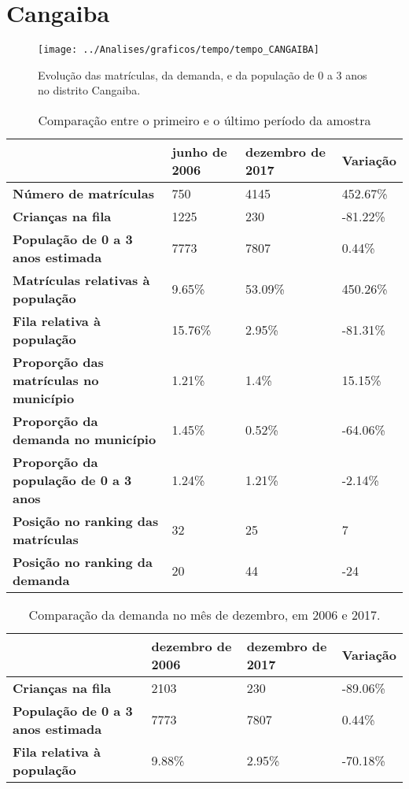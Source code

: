 \section{Cangaiba}
\begin{figure}[H]
\centering
\texttt{[image: ../Analises/graficos/tempo/tempo\_CANGAIBA]}
\caption{Evolução das matrículas, da demanda, e da população de 0 a 3 anos no distrito Cangaiba.}
\end{figure}
\begin{table}[H]
\begin{tabular}{|l|l|l|l|}
\hline
\textbf{}                                      & \textbf{junho de 2006}       & \textbf{dezembro de 2017}    & \textbf{Variação} \\ \hline
\textbf{Número de matrículas}                  & 750 & 4145 & 452.67\% \\ \hline
\textbf{Crianças na fila}                      & 1225 & 230 & -81.22\% \\ \hline
\textbf{População de 0 a 3 anos estimada}      & 7773 & 7807 & 0.44\% \\ \hline
\textbf{Matrículas relativas à população}      & 9.65\% & 53.09\% & 450.26\% \\ \hline
\textbf{Fila relativa à população}             & 15.76\% & 2.95\% & -81.31\% \\ \hline
\textbf{Proporção das matrículas no município} & 1.21\% & 1.4\% & 15.15\% \\ \hline
\textbf{Proporção da demanda no município}     & 1.45\% & 0.52\% & -64.06\% \\ \hline
\textbf{Proporção da população de 0 a 3 anos}  & 1.24\% & 1.21\% & -2.14\% \\ \hline
\textbf{Posição no ranking das matrículas}     & 32 & 25 & 7 \\ \hline
\textbf{Posição no ranking da demanda}         & 20 & 44 & -24 \\ \hline
\end{tabular}
\caption{Comparação entre o primeiro e o último período da amostra}
\end{table}
\begin{table}[H]
\begin{tabular}{|l|l|l|l|}
\hline
\textbf{}                                 & \textbf{dezembro de 2006} & \textbf{dezembro de 2017} & \textbf{Variação} \\ \hline
\textbf{Crianças na fila}                      & 2103 & 230 & -89.06\% \\ \hline
\textbf{População de 0 a 3 anos estimada}      & 7773 & 7807 & 0.44\% \\ \hline
\textbf{Fila relativa à população}             & 9.88\% & 2.95\% & -70.18\% \\ \hline
\end{tabular}
\caption{Comparação da demanda no mês de dezembro, em 2006 e 2017.}
\end{table}

